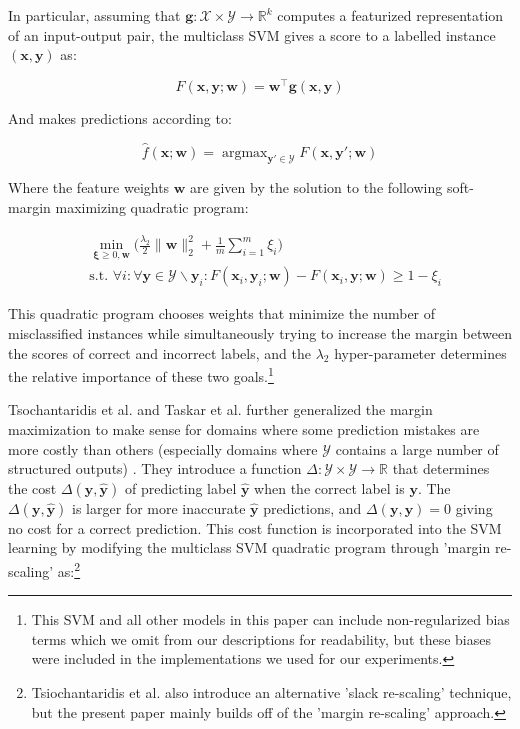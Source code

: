 \documentclass{article} %
\DeclareMathOperator*{\argmax}{argmax}
\begin{document}
In particular, assuming that
$\mathbf{g}:\mathcal{X}\times\mathcal{Y}\rightarrow \mathbb{R}^k$ 
computes a featurized representation of an input-output pair, the 
multiclass SVM gives a score to a labelled instance $(\mathbf{x},\mathbf{y})$ 
as:

\begin{equation}
\label{score}
F(\mathbf{x},\mathbf{y};\mathbf{w})= \mathbf{w}^\top \mathbf{g}(\mathbf{x},\mathbf{y})
\end{equation}

And makes predictions according to:

\begin{equation}
\label{prediction}
\hat{f}(\mathbf{x};\mathbf{w})=\argmax_{\mathbf{y}'\in\mathcal{Y}} F(\mathbf{x},\mathbf{y}';\mathbf{w})
\end{equation}

Where the feature weights $\mathbf{w}$ are given by the
solution to the following soft-margin maximizing quadratic program:

\begin{equation}
\begin{split}
& \min_{\mathbf{\xi}\geq 0, \mathbf{w}}\big(\frac{\lambda_2}{2}\|\mathbf{w}\|_2^2+\frac{1}{m}\sum_{i=1}^m\xi_i\big) \\
& \text{s.t.     } \forall i : \forall \mathbf{y}\in\mathcal{Y}\backslash\mathbf{y}_i : F(\mathbf{x}_i,\mathbf{y}_i;\mathbf{w})-F(\mathbf{x}_i,\mathbf{y};\mathbf{w})\geq 1-\xi_i
\end{split}
\end{equation}

This quadratic program chooses weights that minimize
the number of misclassified instances while simultaneously
trying to increase the margin between the scores of 
correct and incorrect labels, and the $\lambda_2$
hyper-parameter determines the relative importance of
these two goals.\footnote{This SVM and all other models in
this paper can include non-regularized bias terms which
we omit from our descriptions for readability, but these
biases were included in the implementations we used for
our experiments.}

Tsochantaridis et al. and Taskar et al. further generalized 
the margin maximization
to make sense for domains where some prediction mistakes are more 
costly than others (especially domains where $\mathcal{Y}$ contains
a large number of structured outputs) 
\citep{tsochantaridis2004support}\citep{koller2003max}.  
They introduce a function 
$\Delta:\mathcal{Y}\times\mathcal{Y}\rightarrow\mathbb{R}$ that
determines the cost
$\Delta(\mathbf{y},\mathbf{\hat{y}})$ of predicting label 
$\mathbf{\hat{y}}$ when the correct label is $\mathbf{y}$.  
The $\Delta(\mathbf{y},\mathbf{\hat{y}})$ is larger for more 
inaccurate $\mathbf{\hat{y}}$ predictions, and 
$\Delta(\mathbf{y},\mathbf{y})=0$ giving no cost for a correct
prediction. This cost function is incorporated
into the SVM learning by modifying the 
multiclass SVM quadratic
program through 'margin re-scaling' as:\footnote{Tsiochantaridis et al. 
also introduce an alternative 'slack re-scaling' technique, but the 
present paper mainly builds off of the 'margin re-scaling' approach.}
\end{document}
